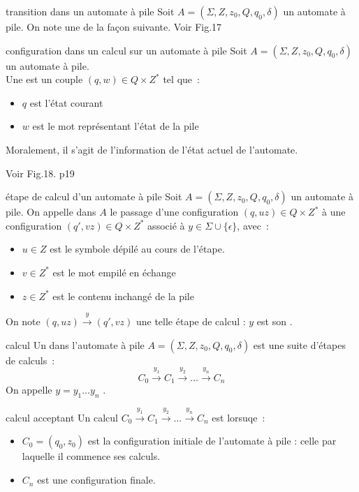 \begin{adjustwidth}{-3cm}{-3cm}
\begin{definition}{}{transition dans un automate à pile}
    Soit $A = (\Sigma, Z, z_0, Q, q_0, \delta)$ un automate à pile. On note une  de la façon suivante. Voir Fig.17
\end{definition}

\begin{definition}{}{configuration dans un calcul sur un automate à pile}
    Soit $A = (\Sigma, Z, z_0, Q, q_0, \delta)$ un automate à pile.\\
    Une  est un couple $(q,w) \in Q \times Z^*$ tel que~:
    \begin{itemize}
        \item $q$ est l'état courant
        \item $w$ est le mot représentant l'état de la pile
    \end{itemize}
    Moralement, il s'agit de l'information de l'état actuel de l'automate.
\end{definition}
Voir Fig.18. p19

\begin{definition}{}{étape de calcul d'un automate à pile}
    Soit $A = (\Sigma, Z, z_0, Q,q_0, \delta)$ un automate à pile. On appelle  dans $A$ le passage d'une configuration $(q,uz) \in Q\times Z^*$ à une configuration $(q',vz) \in Q\times Z^*$ associé à $y \in \Sigma \cup \{\epsilon\}$, avec~:
    \begin{itemize}
        \item $u \in Z$ est le symbole dépilé au cours de l'étape.
        \item $v \in Z^*$ est le mot empilé en échange
        \item $z \in Z^*$ est le contenu inchangé de la pile
    \end{itemize}
    On note $(q,uz) \xrightarrow{y} (q',vz)$ une telle étape de calcul : $y$ est son .
\end{definition}

\begin{definition}{}{calcul}
    Un  dans l'automate à pile $A = (\Sigma, Z, z_0, Q, q_0, \delta)$ est une suite d'étapes de calculs~:
    $$C_0 \xrightarrow{y_1} C_1 \xrightarrow{y_2} \dots \xrightarrow{y_n} C_n$$
    On appelle $y = y_1 \dots y_n$ .
\end{definition}

\begin{definition}{}{calcul acceptant}
    Un calcul $C_0 \xrightarrow{y_1} C_1 \xrightarrow{y_2} \dots \xrightarrow{y_n} C_n$ est  lorsuqe~:
    \begin{itemize}
        \item $C_0 = (q_0,z_0)$ est la configuration initiale de l'automate à pile : celle par laquelle il commence ses calculs.
        \item $C_n$ est une configuration finale.
    \end{itemize}
\end{definition}


\end{adjustwidth}
